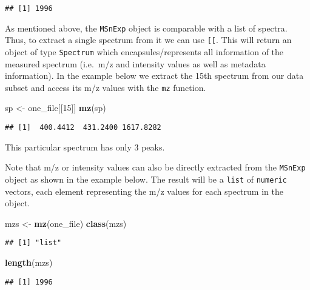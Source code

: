 \documentclass[journal=jacsat,manuscript=suppinfo]{achemso}
\newenvironment{Shaded}{\begin{snugshade}}{\end{snugshade}}
\newcommand{\DecValTok}[1]{\textcolor[rgb]{0.00,0.00,0.81}{#1}}
\newcommand{\KeywordTok}[1]{\textcolor[rgb]{0.13,0.29,0.53}{\textbf{#1}}}
\newcommand{\NormalTok}[1]{#1}
\newcommand{\StringTok}[1]{\textcolor[rgb]{0.31,0.60,0.02}{#1}}
\begin{document}
\begin{verbatim}
## [1] 1996
\end{verbatim}

As mentioned above, the \texttt{MSnExp} object is comparable with a list
of spectra. Thus, to extract a single spectrum from it we can use
\texttt{{[}{[}}. This will return an object of type \texttt{Spectrum}
which encapsules/represents all information of the measured spectrum
(i.e.~m/z and intensity values as well as metadata information). In the
example below we extract the 15th spectrum from our data subset and
access its m/z values with the \texttt{mz} function.

\begin{Shaded}
\begin{Highlighting}[]
\NormalTok{sp \textless{}{-}}\StringTok{ }\NormalTok{one\_file[[}\DecValTok{15}\NormalTok{]]}
\KeywordTok{mz}\NormalTok{(sp)}
\end{Highlighting}
\end{Shaded}

\begin{verbatim}
## [1]  400.4412  431.2400 1617.8282
\end{verbatim}

This particular spectrum has only 3 peaks.

Note that m/z or intensity values can also be directly extracted from
the \texttt{MSnExp} object as shown in the example below. The result
will be a \texttt{list} of \texttt{numeric} vectors, each element
representing the m/z values for each spectrum in the object.

\begin{Shaded}
\begin{Highlighting}[]
\NormalTok{mzs \textless{}{-}}\StringTok{ }\KeywordTok{mz}\NormalTok{(one\_file)}
\KeywordTok{class}\NormalTok{(mzs)}
\end{Highlighting}
\end{Shaded}

\begin{verbatim}
## [1] "list"
\end{verbatim}

\begin{Shaded}
\begin{Highlighting}[]
\KeywordTok{length}\NormalTok{(mzs)}
\end{Highlighting}
\end{Shaded}

\begin{verbatim}
## [1] 1996
\end{verbatim}
\end{document}
